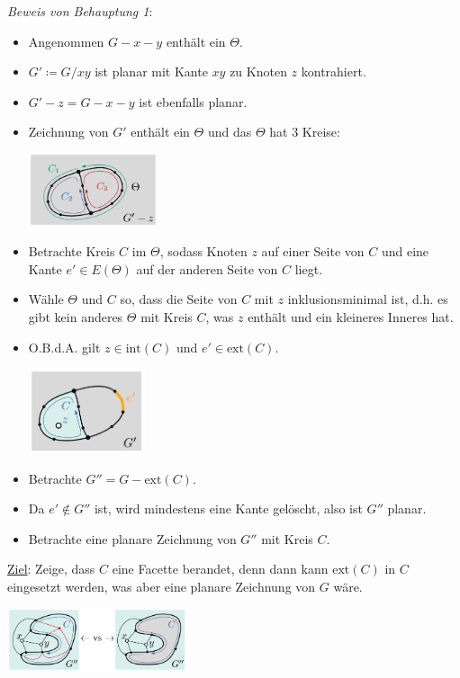 \textit{Beweis von Behauptung 1}:
\begin{itemize}
	\item Angenommen $G-x-y$ enthält ein $\Theta$.
	\item $G'\coloneqq G/xy$ ist planar mit Kante $xy$ zu Knoten $z$ kontrahiert.
	\item $G'-z=G-x-y$ ist ebenfalls planar.
	\item Zeichnung von $G'$ enthält ein $\Theta$ und das $\Theta$ hat 3 Kreise:
	\begin{center}
		\includegraphics[width=0.3\textwidth]{images/wagner-2.png}
	\end{center}
	\item Betrachte Kreis $C$ im $\Theta$, sodass Knoten $z$ auf einer Seite von $C$ und eine Kante $e'\in E(\Theta)$ auf der anderen Seite von $C$ liegt.
	\item Wähle $\Theta$ und $C$ so, dass die Seite von $C$ mit $z$ inklusionsminimal ist, d.h. es gibt kein anderes $\Theta$ mit Kreis $C$, was $z$ enthält und ein kleineres Inneres hat.
	\item O.B.d.A. gilt $z\in\text{int}(C)$ und $e'\in\text{ext}(C)$.
	\begin{center}
		\includegraphics[width=0.27\textwidth]{images/wagner-3.png}
	\end{center}
	\item Betrachte $G''=G-\text{ext}(C)$.
	\item Da $e'\notin G''$ ist, wird mindestens eine Kante gelöscht, also ist $G''$ planar.
	\item Betrachte eine planare Zeichnung von $G''$ mit Kreis $C$.
\end{itemize}

\underline{Ziel}: Zeige, dass $C$ eine Facette berandet, denn dann kann $\text{ext}(C)$ in $C$ eingesetzt werden, was aber eine planare Zeichnung von $G$ wäre. \Lightning
\begin{center}
	\includegraphics[width=0.4\textwidth]{images/wagner-4.png}
\end{center}

